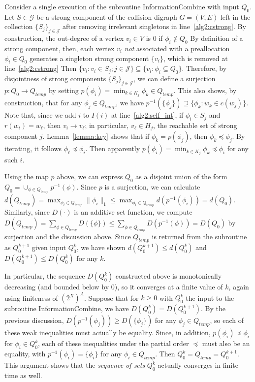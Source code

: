\documentclass[11pt,reqno]{amsart}
\theoremstyle{definition}
\numberwithin{equation}{section}
\newcommand{\inv}{^{-1}}
\newcommand{\pre}{\phi}
\newcommand{\prealloc}{(2^X)^A}
\newcommand{\sub}{\subseteq}
\newcommand{\peq}{\preceq}
\newcommand{\strongc}{\mathcal{G}}
\newcommand{\strongcomp}{S}
\newcommand{\acto}{Q_0}
\newcommand{\actok}{Q_0^k}
\newcommand{\actt}{Q_{temp}}
\newcommand{\disto}{d}
\newcommand{\distt}{D}
\newcommand{\coll}{I}
\newcommand{\reach}{H}
\begin{document}
\begin{enumerate}
Consider a single execution of the subroutine InformationCombine with input $\acto$.
Let $\strongcomp \in \strongc$ be a strong component of the collision digraph $G = (V,E)$ left in the collection $\{\strongcomp_j\}_{j \in \mathcal{J}}$ after removing irrelevant singletons in line~\ref{alg2:cstrong}.
By construction, the out-degree of a vertex $v_i \in V$ is $0$ if $\pre_i \not \in \acto$
By definition of a strong component, then, each vertex $v_i$ \emph{not} associated with a preallocation $\pre_i \in \acto$ generates a singleton strong component $\{v_i\}$, which is removed at line~\ref{alg2:cstrong}
Then $\{v_i: v_i \in \strongcomp_j; j \in \mathcal{J}\} \sub \{v_i: \pre_i \sub \acto\}$. 
Therefore, by disjointness of strong components $\{\strongcomp_j\}_{j \in \mathcal{J}}$, we can define a surjection $p: \acto \to \actt$ by setting $p(\pre_i) = \min_{k \in K_j} \pre_k \in \actt$. 
This also shows, by construction, that for any $\pre_j \in \actt$, we have $p\inv(\{\pre_j\}) \supseteq \{\pre_k: w_k \in c(w_j)\}$. 
Note that, since we add $i$ to $\coll(i)$ at line~\ref{alg2:self_int}, if $\pre_i \in \strongcomp_j$ and $r(w_i) = w_{\ell}$, then $v_i \to v_{\ell}$; in particular, $v_{\ell} \in \reach_j$, the reachable set of strong component $j$.
Lemma~\ref{lemma:key} shows that if $\pre_k = p(\pre_j)$, then $\pre_k \peq \pre_j$. By iterating, it follows $\pre_{\ell} \peq \pre_i$. %
Then apparently $p(\pre_i) = \min_{k \in K_j} \pre_k \peq \pre_i$ for any such $i$. 

Using the map $p$ above, we can express $\acto$ as a disjoint union of the form $\acto = \cup_{\pre \in \actt} p\inv(\pre)$.
Since $p$ is a surjection, we can calculate $\disto(\actt) = \max_{\pre_i \in \actt} \|\pre_i\|_1 \leq \max_{\pre_i \in \actt} \disto(p\inv(\pre_i)) = \disto(\acto)$. 
Similarly, since $\distt(\cdot)$ is an additive set function, we compute $\distt(\actt) = \sum_{\pre \in \actt} \distt(\{\pre\}) \leq \sum_{\pre \in \actt} \distt(p\inv(\pre)) = \distt(\acto)$ by surjection and the discussion above.
Since $\actt$ is returned from the subroutine as $\acto^{k + 1}$ given input $\actok$, we have shown $\disto(\acto^{k+1}) \leq \disto(\actok)$ and $\distt(\acto^{k+1}) \leq \distt(\actok)$ for any $k$. 

In particular, the sequence $\distt(\actok)$ constructed above is monotonically decreasing (and bounded below by 0), so it converges at a finite value of $k$, again using finiteness of $\prealloc$. 
Suppose that for $k \geq 0$ with $\actok$ the input to the subroutine InformationCombine, we have $\distt(\actok) = \distt(\acto^{k+1})$.
By the previous discussion, $\distt(p\inv(\pre_j)) \geq \distt(\{\pre_j\})$ for any $\pre_j \in \actt$, so each of these weak inequalities must actually be equality. 
Since, in addition, $p(\pre_i) \peq \pre_i$ for $\pre_i \in \actok$, each of these inequalities under the partial order $\peq$ must also be an equality, with $p\inv(\pre_i) = \{\pre_i\}$ for any $\pre_i \in \actt$.
Then $\actok = \actt = \acto^{k+1}$. 
This argument shows that the \emph{sequence of sets} $\actok$ actually converges in finite time as well. 


\end{enumerate}
\end{document}
